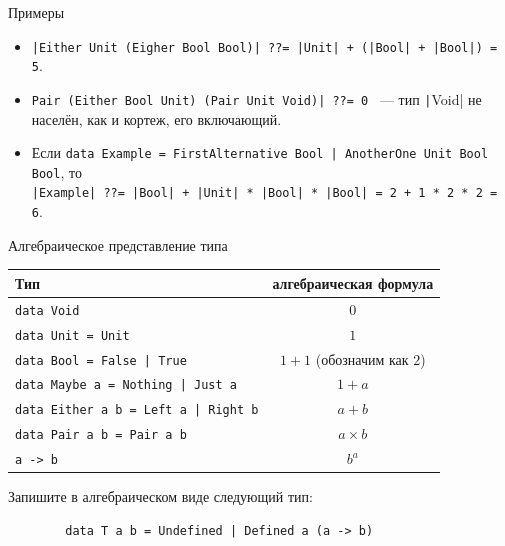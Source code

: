     \begin{frame}[fragile]{Примеры}
        \pause
        \begin{itemize}
            \item \texttt{|Either Unit (Eigher Bool Bool)| ?\pause?= |Unit| + (|Bool| + |Bool|) = 5}.
            \item \texttt{Pair (Either Bool Unit) (Pair Unit Void)| ?\pause?= 0} ~--- тип \texttt|Void| не населён, как и кортеж, его включающий.
            \item Если \texttt{data Example = FirstAlternative Bool | AnotherOne Unit Bool Bool}, то \\\texttt{|Example| ?\pause?= |Bool| + |Unit| * |Bool| * |Bool| = 2 + 1 * 2 * 2 = 6}.
        \end{itemize}
    \end{frame}

    \begin{frame}[fragile]{Алгебраическое представление типа}
        \begin{center}
            \begin{tabular}{|p{}|c|}
                \hline
                Тип                                                      & алгебраическая формула      \\
                \hline
                \texttt{data Void}                          & $0$                         \\
                \texttt{data Unit = Unit}                   & $1$                         \\
                \texttt{data Bool = False | True}           & $1 + 1$ (обозначим как $2$) \\
                \texttt{data Maybe a = Nothing | Just a}    & $1 + a$                     \\
                \texttt{data Either a b = Left a | Right b} & $a + b$                     \\
                \texttt{data Pair a b = Pair a b}           & $a \times b$                \\
                \texttt{a -> b}                             & $b^a$                       \\
                \hline
            \end{tabular}
        \end{center}

        \pause\vspace{1em}
        Запишите в алгебраическом виде следующий тип:
        \begin{verbatim}
        data T a b = Undefined | Defined a (a -> b)
        \end{verbatim}
    \end{frame}

